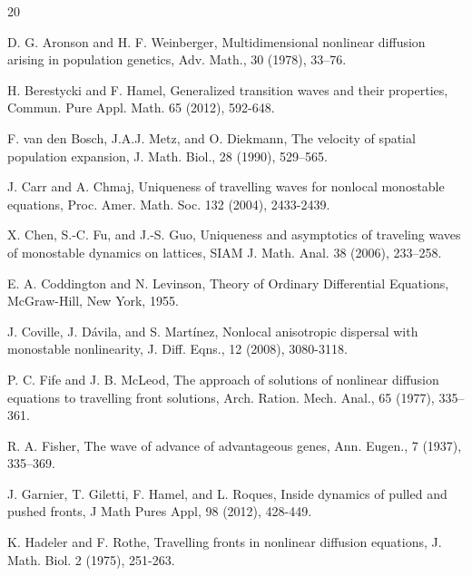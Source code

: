 \documentclass[11pt,a4paper]{article}
\numberwithin{equation}{section}
\numberwithin{figure}{section}
\begin{document}
\begin{thebibliography}{20}%
%
%


{D. G. Aronson and H. F. Weinberger},
Multidimensional nonlinear diffusion arising
in population genetics,
Adv. Math., 30 (1978), 33--76.


{H. Berestycki and F. Hamel}, Generalized transition waves and their properties,
Commun. Pure Appl. Math. 65 (2012), 592-648.




{F. van den Bosch, J.A.J. Metz, and O. Diekmann},  
The velocity of spatial population expansion, J. Math. Biol., 28 (1990), 529–565.


{J. Carr and A. Chmaj},
Uniqueness of travelling waves for nonlocal monostable equations,
Proc. Amer. Math. Soc. 132 (2004), 2433-2439.



 {X. Chen, S.-C. Fu, and J.-S. Guo},
 Uniqueness and asymptotics of traveling waves of monostable dynamics on lattices, SIAM J. Math. Anal. 38 (2006), 233–258.

 {E. A. Coddington and N. Levinson}, Theory
of Ordinary Differential Equations, McGraw-Hill, New York, 1955.

{J. Coville, J. Dávila, and S. Martínez},
Nonlocal anisotropic dispersal with monostable nonlinearity,
J. Diff. Eqns.,
12 (2008), 3080-3118.



{P. C. Fife and J. B. McLeod}, The approach of solutions of nonlinear diffusion equations to travelling front solutions,
 Arch. Ration. Mech. Anal., 65 (1977), 335--361.

{R. A. Fisher},
The wave of advance of advantageous genes,
Ann. Eugen., 7 (1937), 335--369.



{J. Garnier, T. Giletti, F. Hamel, and L. Roques}, Inside dynamics of pulled and pushed fronts,
J Math Pures Appl, 98 (2012), 428-449.



{K. Hadeler and F. Rothe},
Travelling fronts in nonlinear diffusion equations, J. Math.
Biol. 2 (1975), 251-263.




\end{thebibliography}
\end{document}
